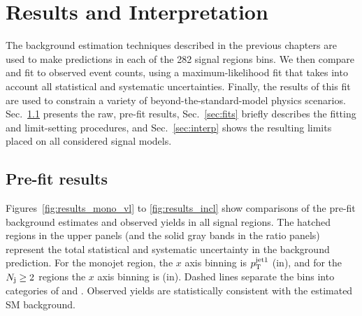 \chapter{Results and Interpretation}
\label{chap:results}

The background estimation techniques described in the previous chapters are used to make predictions
in each of the 282 signal regions bins. We then compare and fit to observed event counts, using a
maximum-likelihood fit that takes into account all statistical and systematic uncertainties.
Finally, the results of this fit are used to constrain a variety of beyond-the-standard-model physics
scenarios. Sec.~\ref{sec:prefit} presents the raw, pre-fit results, Sec.~\ref{sec:fits} briefly describes
the fitting and limit-setting procedures, and Sec.~\ref{sec:interp} shows
the resulting limits placed on all considered signal models.

\section{Pre-fit results}
\label{sec:prefit}

Figures~\ref{fig:results_mono_vl} to \ref{fig:results_incl} show comparisons of the pre-fit background estimates
and observed yields in all signal regions. The hatched regions in the upper panels (and the solid gray bands
in the ratio panels) represent the total statistical and systematic uncertainty in the background prediction.
For the monojet region, the $x$ axis binning is $p_{\mathrm{T}}^{\mathrm{jet1}}$ (in\GeV), and for the $N_{\mathrm{j}}\geq2$ regions
the $x$ axis binning is \mttwo (in\GeV). Dashed lines separate the bins into categories of \Nj and \Nb.
Observed yields are statistically consistent with the estimated SM background.

